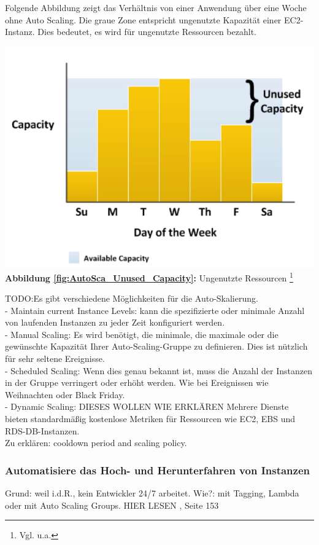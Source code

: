 Folgende Abbildung zeigt das Verhältnis von einer Anwendung über eine Woche ohne Auto Scaling.
Die graue Zone entspricht ungenutzte Kapazität einer EC2-Instanz. Dies bedeutet, es wird für ungenutzte Ressourcen bezahlt.
\begin{center}
    \includegraphics[scale=0.7]{sources/AutoCap Unused Capacity}\label{fig:AutoSca_Unused_Capacity}\\
    \textbf{Abbildung \autoref{fig:AutoSca_Unused_Capacity}:} Ungenutzte Ressourcen
    \footnote{Vgl. u.a.\cite{AMZ01}}
\end{center}
TODO:Es gibt verschiedene Möglichkeiten für die Auto-Skalierung.
\\
- Maintain current Instance Levels: kann die spezifizierte oder minimale Anzahl von laufenden Instanzen zu jeder Zeit konfiguriert werden.
\\
- Manual Scaling: Es wird benötigt, die minimale, die maximale oder die gewünschte Kapazität Ihrer Auto-Scaling-Gruppe zu definieren. Dies ist nützlich für sehr seltene Ereignisse. 
\\
- Scheduled Scaling: Wenn dies genau bekannt ist, muss die Anzahl der Instanzen in der Gruppe verringert oder erhöht werden. Wie bei Ereignissen wie Weihnachten oder Black Friday.
\\
- Dynamic Scaling: DIESES WOLLEN WIE ERKLÄREN
Mehrere Dienste bieten standardmäßig kostenlose Metriken für Ressourcen wie EC2, EBS und RDS-DB-Instanzen.
\\
Zu erklären: cooldown period and scaling policy.


\subsubsection{Automatisiere das Hoch- und Herunterfahren von Instanzen}
Grund: weil i.d.R., kein Entwickler 24/7 arbeitet.
Wie?: mit Tagging, Lambda oder mit Auto Scaling Groups.
HIER LESEN {\cite{CCB}, Seite 153}

